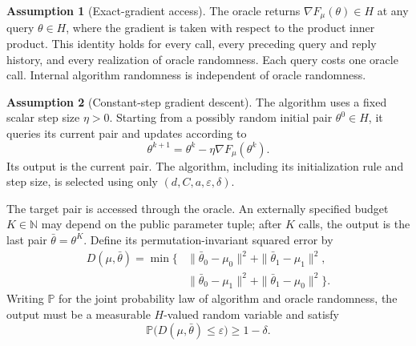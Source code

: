 \documentclass[10pt]{article}
\theoremstyle{definition}
\newtheorem{assumption}{Assumption}
\begin{document}
\begin{assumption}[Exact-gradient access]
The oracle returns $\nabla F_\mu(\theta)\in H$ at any query $\theta\in H$, where the gradient is taken with respect to the product inner product. This identity holds for every call, every preceding query and reply history, and every realization of oracle randomness. Each query costs one oracle call. Internal algorithm randomness is independent of oracle randomness.
\end{assumption}

\begin{assumption}[Constant-step gradient descent]
The algorithm uses a fixed scalar step size $\eta>0$. Starting from a possibly random initial pair $\theta^0\in H$, it queries its current pair and updates according to
\[
\theta^{k+1}=\theta^k-\eta\nabla F_\mu(\theta^k).
\]
Its output is the current pair. The algorithm, including its initialization rule and step size, is selected using only $(d,C,a,\varepsilon,\delta)$.
\end{assumption}

The target pair is accessed through the oracle. An externally specified budget $K\in\mathbb{N}$ may depend on the public parameter tuple; after $K$ calls, the output is the last pair $\bar{\theta}=\theta^K$. Define its permutation-invariant squared error by
\[
\begin{aligned}
D(\mu,\bar{\theta})=\min\bigl\{&
\|\bar{\theta}_0-\mu_0\|^2+\|\bar{\theta}_1-\mu_1\|^2,\\
&\|\bar{\theta}_0-\mu_1\|^2+\|\bar{\theta}_1-\mu_0\|^2
\bigr\}.
\end{aligned}
\]
Writing $\mathbb{P}$ for the joint probability law of algorithm and oracle randomness, the output must be a measurable $H$-valued random variable and satisfy
\[
\mathbb{P}\bigl(D(\mu,\bar{\theta})\leq\varepsilon\bigr)
\geq1-\delta.
\]
\end{document}
